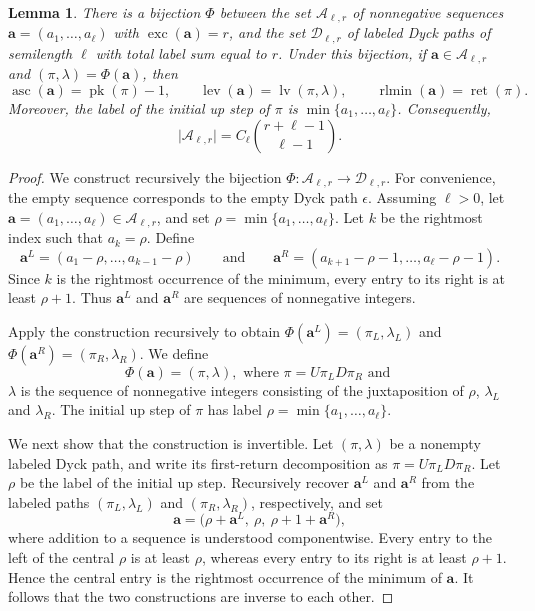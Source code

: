 \documentclass[12pt]{amsart}
\theoremstyle{plain}
\newtheorem{lemma}[theorem]{Lemma}
\theoremstyle{definition}
\DeclareMathOperator{\lv}{lv}
\DeclareMathOperator{\pk}{pk}
\DeclareMathOperator{\ret}{ret}
\DeclareMathOperator{\lev}{lev}
\DeclareMathOperator{\asc}{asc}
\DeclareMathOperator{\rlmin}{rlmin}
\begin{document}
\begin{lemma}\label{lem:decorated-Dyck}
There is a bijection $\Phi$ between the set $\mathcal{A}_{\ell,r}$ of nonnegative sequences $\mathbf a=(a_1,\ldots, a_\ell)$ with  $\operatorname{exc}(\mathbf a)=r$, and the set $\mathcal{D}_{\ell,r}$ of labeled  Dyck paths of
semilength $\ell$ with total label sum equal to $r$.  Under this bijection, if $\mathbf{a}\in\mathcal{A}_{\ell,r}$ and $(\pi,\lambda)=\Phi(\mathbf a)$, then
\[
\asc(\mathbf{a})=\pk(\pi)-1,
\qquad
\lev(\mathbf{a})=\lv(\pi,\lambda),
\qquad
\rlmin(\mathbf{a})=\ret(\pi).
\]
Moreover, the label of the initial up step of $\pi$ is $\min\{a_1,\ldots,a_\ell\}$.  Consequently, 
\[
\lvert\mathcal{A}_{\ell,r}\rvert
=
C_\ell\binom{r+\ell-1}{\ell-1}.
\]
\end{lemma}
\begin{proof}
  We construct recursively the bijection  $\Phi:\mathcal{A}_{\ell,r}\longrightarrow\mathcal{D}_{\ell,r}$.   For convenience, the empty sequence
corresponds to the empty Dyck path $\epsilon$. Assuming $\ell>0$, let $\mathbf{a}=(a_1,\ldots,a_\ell)\in\mathcal{A}_{\ell,r}$, and set $\rho=\min\{a_1,\ldots,a_\ell\}$. Let $k$ be the rightmost index such that $a_k=\rho$. Define
\[
\mathbf{a}^{L}
=
(a_1-\rho,\ldots,a_{k-1}-\rho) \qquad \text{and} \qquad 
\mathbf{a}^{R}
=
(a_{k+1}-\rho-1,\ldots,a_\ell-\rho-1).
\]
Since $k$ is the rightmost occurrence of the minimum, every entry to its
right is at least $\rho+1$. Thus $\mathbf{a}^{L}$ and
$\mathbf{a}^{R}$ are sequences of nonnegative integers.



  Apply the construction recursively to obtain $\Phi(\mathbf{a}^{L})=(\pi_L,\lambda_L)$ and $\Phi(\mathbf{a}^{R})=(\pi_R,\lambda_R)$. We define
\[
\Phi(\mathbf{a})=(\pi,\lambda),
 \text{ where } 
\pi=U\pi_LD\pi_R \text{ and } 
\]
$\lambda$ is the sequence of nonnegative integers consisting of the juxtaposition of $\rho$, $\lambda_L$ and $\lambda_R$.
 The initial up step of
$\pi$ has label $\rho=\min\{a_1,\ldots,a_\ell\}$.

We next show that the construction is invertible. Let $(\pi,\lambda)$ be
a nonempty labeled Dyck path, and write its first-return decomposition as $\pi=U\pi_LD\pi_R$. Let $\rho$ be the label of the initial up step. Recursively recover
$\mathbf{a}^{L}$ and $\mathbf{a}^{R}$ from the labeled paths
$(\pi_L,\lambda_L)$ and $(\pi_R,\lambda_R)$, respectively, and set
\[
\mathbf{a}
=
\bigl(
\rho+\mathbf{a}^{L},
\ \rho,\
\rho+1+\mathbf{a}^{R}
\bigr),
\]
where addition to a sequence is understood componentwise. Every entry to the
left of the central $\rho$ is at least $\rho$, whereas every entry to its
right is at least $\rho+1$. Hence the central entry is the rightmost
occurrence of the minimum of $\mathbf{a}$. It follows that the two
constructions are inverse to each other.


\end{proof}
\end{document}
